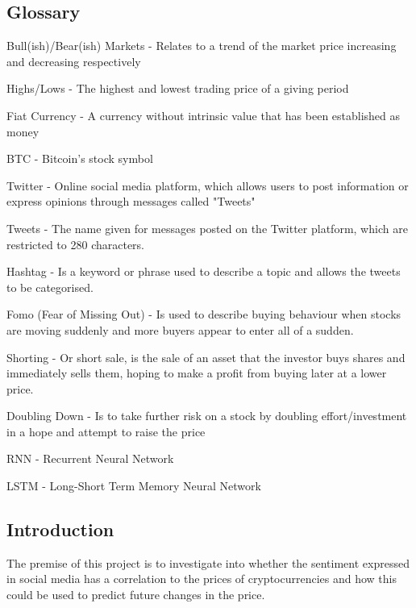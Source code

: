 \documentclass[oneside, 10pt]{article}
\begin{document}
	\newpage
	\begin{center}
		\section{Glossary}\label{glossary}
	\end{center}
	Bull(ish)/Bear(ish) Markets - Relates to a trend of the market price increasing and decreasing respectively
	
	Highs/Lows - The highest and lowest trading price of a giving period
	
	Fiat Currency - A currency without intrinsic value that has been established as money
	
	BTC - Bitcoin's stock symbol
	
	Twitter - Online social media platform, which allows users to post information or express opinions through messages called "Tweets"
	
	Tweets - The name given for messages posted on the Twitter platform, which are restricted to 280 characters.
	
	Hashtag - Is a keyword or phrase used to describe a topic and allows the tweets to be categorised.
	
	Fomo (Fear of Missing Out) - Is used to describe buying behaviour when stocks are moving suddenly and more buyers appear to enter all of a sudden.
	
	Shorting - Or short sale, is the sale of an asset that the investor buys shares and immediately sells them, hoping to make a profit from buying later at a lower price.
	
	Doubling Down - Is to take further risk on a stock by doubling effort/investment in a hope and attempt to raise the price
	
	RNN - Recurrent Neural Network
	
	LSTM - Long-Short Term Memory Neural Network
	
	\newpage
	
	\begin{center}
		\tableofcontents
	\end{center}
	
	\newpage
	\begin{center}
		\section{Introduction}\label{introduction}
	\end{center}
	The premise of this project is to investigate into whether the sentiment expressed in social media has a correlation to the prices of cryptocurrencies and how this could be used to predict future changes in the price. 
	
\end{document}
